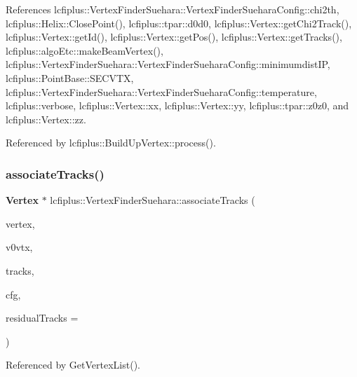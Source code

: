References lcfiplus\+::\+Vertex\+Finder\+Suehara\+::\+Vertex\+Finder\+Suehara\+Config\+::chi2th, lcfiplus\+::\+Helix\+::\+Close\+Point(), lcfiplus\+::tpar\+::d0d0, lcfiplus\+::\+Vertex\+::get\+Chi2\+Track(), lcfiplus\+::\+Vertex\+::get\+Id(), lcfiplus\+::\+Vertex\+::get\+Pos(), lcfiplus\+::\+Vertex\+::get\+Tracks(), lcfiplus\+::algo\+Etc\+::make\+Beam\+Vertex(), lcfiplus\+::\+Vertex\+Finder\+Suehara\+::\+Vertex\+Finder\+Suehara\+Config\+::minimumdist\+IP, lcfiplus\+::\+Point\+Base\+::\+S\+E\+C\+V\+TX, lcfiplus\+::\+Vertex\+Finder\+Suehara\+::\+Vertex\+Finder\+Suehara\+Config\+::temperature, lcfiplus\+::verbose, lcfiplus\+::\+Vertex\+::xx, lcfiplus\+::\+Vertex\+::yy, lcfiplus\+::tpar\+::z0z0, and lcfiplus\+::\+Vertex\+::zz.



Referenced by lcfiplus\+::\+Build\+Up\+Vertex\+::process().

\mbox{\label{namespacelcfiplus_1_1VertexFinderSuehara_a561fdd6b1766a505021f77f248b5e58a}} 
\subsubsection{associate\+Tracks()}
{\footnotesize\ttfamily \textbf{ Vertex} $\ast$ lcfiplus\+::\+Vertex\+Finder\+Suehara\+::associate\+Tracks (\begin{DoxyParamCaption}\item[{\textbf{ Vertex} $\ast$}]{vertex,  }\item[{const \textbf{ Vertex\+Vec} \&}]{v0vtx,  }\item[{list$<$ const \textbf{ Track} $\ast$$>$ \&}]{tracks,  }\item[{\textbf{ Vertex\+Finder\+Suehara\+Config} \&}]{cfg,  }\item[{list$<$ const \textbf{ Track} $\ast$$>$ $\ast$}]{residual\+Tracks = {} }\end{DoxyParamCaption})}



Referenced by Get\+Vertex\+List().

\mbox{\label{namespacelcfiplus_1_1VertexFinderSuehara_ac342f7caac2af7bbe2aa77b578a3815e}} 
